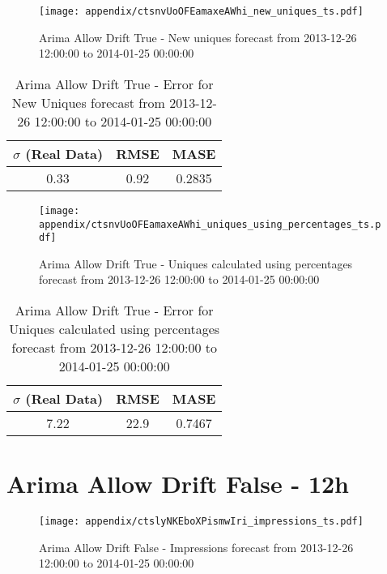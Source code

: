 \begin{figure}[H] \begin{center} \leavevmode
\texttt{[image: appendix/ctsnvUoOFEamaxeAWhi\_new\_uniques\_ts.pdf]} \caption{
Arima Allow Drift True - New uniques forecast from 2013-12-26 12:00:00 to 2014-01-25 00:00:00} \label{fig:appendix/ctsnvUoOFEamaxeAWhi_new_uniques_ts.pdf} \end{center}
\end{figure}

\begin{table}[H]
\centering
\footnotesize
\begin{tabular}{ccc}
$\sigma$ (Real Data) & RMSE & MASE   \\ \hline
0.33 & 0.92 & 0.2835 \\
\end{tabular}

\vspace{0.5cm}

\caption{
Arima Allow Drift True - Error for New Uniques forecast from 2013-12-26 12:00:00 to 2014-01-25 00:00:00}
\end{table}

\begin{figure}[H] \begin{center} \leavevmode
\texttt{[image: appendix/ctsnvUoOFEamaxeAWhi\_uniques\_using\_percentages\_ts.pdf]} \caption{
Arima Allow Drift True - Uniques calculated using percentages forecast from 2013-12-26 12:00:00 to 2014-01-25 00:00:00} \label{fig:appendix/ctsnvUoOFEamaxeAWhi_uniques_using_percentages_ts.pdf} \end{center}
\end{figure}

\begin{table}[H]
\centering
\footnotesize
\begin{tabular}{ccc}
$\sigma$ (Real Data) & RMSE & MASE   \\ \hline
7.22 & 22.9 & 0.7467 \\
\end{tabular}

\vspace{0.5cm}

\caption{
Arima Allow Drift True - Error for Uniques calculated using percentages forecast from 2013-12-26 12:00:00 to 2014-01-25 00:00:00}
\end{table}

\section{Arima Allow Drift False - 12h}
\begin{figure}[H] \begin{center} \leavevmode
\texttt{[image: appendix/ctslyNKEboXPismwIri\_impressions\_ts.pdf]} \caption{
Arima Allow Drift False - Impressions forecast from 2013-12-26 12:00:00 to 2014-01-25 00:00:00} \label{fig:appendix/ctslyNKEboXPismwIri_impressions_ts.pdf} \end{center}
\end{figure}

